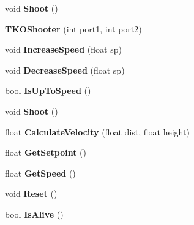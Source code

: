 \begin{DoxyCompactItemize}
\item 
\hypertarget{class_t_k_o_shooter_ab3b3f27ccb68e0d2f17beacdf866c6d7}{void {\bfseries Shoot} ()}\label{class_t_k_o_shooter_ab3b3f27ccb68e0d2f17beacdf866c6d7}

\item 
\hypertarget{class_t_k_o_shooter_afebd0cc2e0d128cf4ac33db914e57e56}{{\bfseries T\-K\-O\-Shooter} (int port1, int port2)}\label{class_t_k_o_shooter_afebd0cc2e0d128cf4ac33db914e57e56}

\item 
\hypertarget{class_t_k_o_shooter_a7a17d08c1435f7a0e200d4309784af5b}{void {\bfseries Increase\-Speed} (float sp)}\label{class_t_k_o_shooter_a7a17d08c1435f7a0e200d4309784af5b}

\item 
\hypertarget{class_t_k_o_shooter_affb81e799fbb4bb327d6a9d65df968a9}{void {\bfseries Decrease\-Speed} (float sp)}\label{class_t_k_o_shooter_affb81e799fbb4bb327d6a9d65df968a9}

\item 
\hypertarget{class_t_k_o_shooter_a3d5394ebe40c0112519cf50290e99dca}{bool {\bfseries Is\-Up\-To\-Speed} ()}\label{class_t_k_o_shooter_a3d5394ebe40c0112519cf50290e99dca}

\item 
\hypertarget{class_t_k_o_shooter_ab3b3f27ccb68e0d2f17beacdf866c6d7}{void {\bfseries Shoot} ()}\label{class_t_k_o_shooter_ab3b3f27ccb68e0d2f17beacdf866c6d7}

\item 
\hypertarget{class_t_k_o_shooter_ae52fc1b5cae7ecde77b5fa472d7ba833}{float {\bfseries Calculate\-Velocity} (float dist, float height)}\label{class_t_k_o_shooter_ae52fc1b5cae7ecde77b5fa472d7ba833}

\item 
\hypertarget{class_t_k_o_shooter_a8f00fad59ad921c64dc3c95ce656fb6a}{float {\bfseries Get\-Setpoint} ()}\label{class_t_k_o_shooter_a8f00fad59ad921c64dc3c95ce656fb6a}

\item 
\hypertarget{class_t_k_o_shooter_a60a892c5dbce0e1df280b34a8bbb9e64}{float {\bfseries Get\-Speed} ()}\label{class_t_k_o_shooter_a60a892c5dbce0e1df280b34a8bbb9e64}

\item 
\hypertarget{class_t_k_o_shooter_afdd4b9253259c236f59dcc73f6c2f691}{void {\bfseries Reset} ()}\label{class_t_k_o_shooter_afdd4b9253259c236f59dcc73f6c2f691}

\item 
\hypertarget{class_t_k_o_shooter_ab0a3016dbcd8adb61eadb677e924c64c}{bool {\bfseries Is\-Alive} ()}\label{class_t_k_o_shooter_ab0a3016dbcd8adb61eadb677e924c64c}


\end{DoxyCompactItemize}

